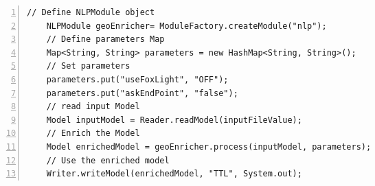 \documentclass[a4paper,twoside,bibtotoc,abstracton,12pt,BCOR=15mm]{article}
\begin{document}
\begin{table}
\begin{tabularx}{\textwidth}{@{}lX@{}}
    \midrule
    \end{tabularx}
    \end{table}

    \begin{lstlisting}[label=lst:NLPModule, float=tp, numbers=left, numberstyle=\tiny, caption = Code fragment to call the \texttt{NLPModule} class.]
    // Define NLPModule object
    NLPModule geoEnricher= ModuleFactory.createModule("nlp");
    // Define parameters Map
    Map<String, String> parameters = new HashMap<String, String>();
    // Set parameters
    parameters.put("useFoxLight", "OFF");
    parameters.put("askEndPoint", "false");
    // read input Model
    Model inputModel = Reader.readModel(inputFileValue);
    // Enrich the Model
    Model enrichedModel = geoEnricher.process(inputModel, parameters);
    // Use the enriched model
    Writer.writeModel(enrichedModel, "TTL", System.out);
    \end{lstlisting}
    
\end{document}
